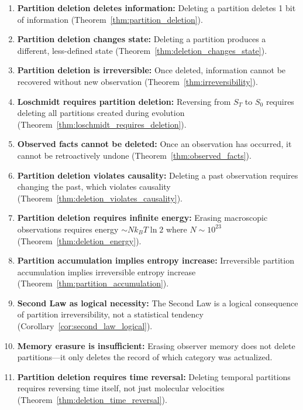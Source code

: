 \documentclass[twocolumn,10pt]{article}
\theoremstyle{definition}
\theoremstyle{remark}
\begin{document}
\begin{enumerate}
\item \textbf{Partition deletion deletes information:} Deleting a partition deletes 1 bit of information (Theorem~\ref{thm:partition_deletion}).

\item \textbf{Partition deletion changes state:} Deleting a partition produces a different, less-defined state (Theorem~\ref{thm:deletion_changes_state}).

\item \textbf{Partition deletion is irreversible:} Once deleted, information cannot be recovered without new observation (Theorem~\ref{thm:irreversibility}).

\item \textbf{Loschmidt requires partition deletion:} Reversing from $S_T$ to $S_0$ requires deleting all partitions created during evolution (Theorem~\ref{thm:loschmidt_requires_deletion}).

\item \textbf{Observed facts cannot be deleted:} Once an observation has occurred, it cannot be retroactively undone (Theorem~\ref{thm:observed_facts}).

\item \textbf{Partition deletion violates causality:} Deleting a past observation requires changing the past, which violates causality (Theorem~\ref{thm:deletion_violates_causality}).

\item \textbf{Partition deletion requires infinite energy:} Erasing macroscopic observations requires energy $\sim N k_B T \ln 2$ where $N \sim 10^{23}$ (Theorem~\ref{thm:deletion_energy}).

\item \textbf{Partition accumulation implies entropy increase:} Irreversible partition accumulation implies irreversible entropy increase (Theorem~\ref{thm:partition_accumulation}).

\item \textbf{Second Law as logical necessity:} The Second Law is a logical consequence of partition irreversibility, not a statistical tendency (Corollary~\ref{cor:second_law_logical}).

\item \textbf{Memory erasure is insufficient:} Erasing observer memory does not delete partitions—it only deletes the record of which category was actualized.

\item \textbf{Partition deletion requires time reversal:} Deleting temporal partitions requires reversing time itself, not just molecular velocities (Theorem~\ref{thm:deletion_time_reversal}).
\end{enumerate}
\end{document}
